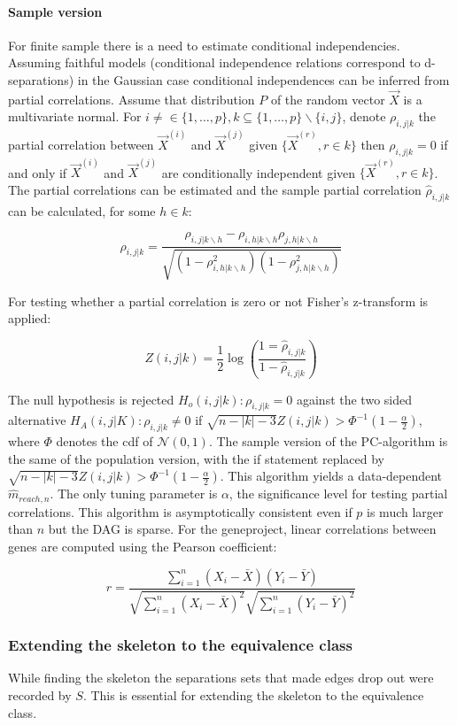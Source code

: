 			\paragraph{Sample version}
			For finite sample there is a need to estimate conditional independencies.
			Assuming faithful models (conditional independence relations correspond to d-separations) in the Gaussian case conditional independences can be inferred from partial correlations.
			Assume that distribution $P$ of the random vector $\vec{X}$ is a multivariate normal.
			For $i\neq\in\{1,\dots,p\}, k\subseteq\{1,\dots, p\}\backslash\{i,j\}$, denote $\rho_{i,j|k}$ the partial correlation between $\vec{X}^{(i)}$ and $\vec{X}^{(j)}$ given $\{\vec{X}^{(r)}, r\in k\}$ then $\rho_{i,j|k} = 0$ if and only if $\vec{X}^{(i)}$ and $\vec{X}^{(j)}$ are conditionally independent given $\{\vec{X}^{(r)}, r\in k\}$.
			The partial correlations can be estimated and the sample partial correlation $\hat{\rho}_{i,j|k}$ can be calculated, for some $h\in k$:

			$$\rho_{i,j|k} = \frac{\rho_{i,j|k\backslash h}-\rho_{i,h|k\backslash h}\rho_{j,h|k\backslash h}}{\sqrt{(1-\rho^2_{i,h|k\backslash h})(1-\rho^2_{j,h|k\backslash h})}}$$

			For testing whether a partial correlation is zero or not Fisher's z-transform is applied:

			$$Z(i,j|k) = \frac{1}{2} \log(\frac{1=\hat{\rho}_{i,j|k}}{1-\hat{\rho}_{i,j|k}})$$

			The null hypothesis is rejected $H_o(i,j|k):\rho_{i,j|k} = 0$ against the two sided alternative $H_A(i,j|K): \rho_{i,j|k} \neq 0$ if $\sqrt{n-|k|-3}Z(i,j|k)>\Phi^{-1}(1-\frac{\alpha}{2})$, where $\Phi$ denotes the cdf of $\mathcal{N}(0,1)$.
			The sample version of the PC-algorithm is the same of the population version, with the if statement replaced by $\sqrt{n-|k|-3}Z(i,j|k)>\Phi^{-1}(1-\frac{\alpha}{2})$.
			This algorithm yields a data-dependent $\hat{m}_{reach,n}$.
			The only tuning parameter is $\alpha$, the significance level for testing partial correlations.
			This algorithm is asymptotically consistent even if $p$ is much larger than $n$ but the DAG is sparse.
			For the gene\@home project, linear correlations between genes are computed using the Pearson coefficient:

			$$r = \frac{\sum\limits_{i=1}^n(X_i-\bar{X})(Y_i-\bar{Y})}{\sqrt{\sum\limits_{i=1}^n(X_i-\bar{X})^2}\sqrt{\sum\limits_{i=1}^n(Y_i-\bar{Y})^2}}$$

		\subsubsection{Extending the skeleton to the equivalence class}
		While finding the skeleton the separations sets that made edges drop out were recorded by $S$.
		This is essential for extending the skeleton to the equivalence class.


